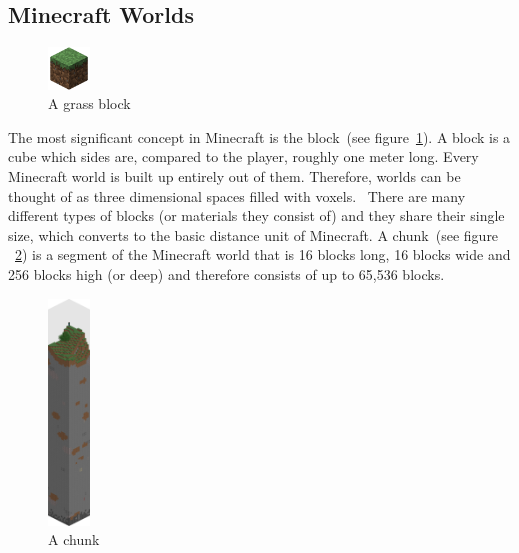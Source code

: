     \subsection{Minecraft Worlds}
    
\begin{figure}
  \begin{center}
    \includegraphics[width=0.1\textwidth]{graphics/block}
  \end{center}
  \caption[A grass block]{A grass block \cite{image_block}}
  \label{mc_block}
\end{figure}

The most significant concept in Minecraft is the block~(see figure~\ref{mc_block}). A block is a cube which sides are, compared to the player, roughly one meter long. Every Minecraft world is built up entirely out of them. Therefore, worlds can be thought of as three dimensional spaces filled with voxels.~\cite{baloghcodemetropolis} There are many different types of blocks (or materials they consist of) and they share their single size, which converts to the basic distance unit of Minecraft. A chunk~(see figure ~\ref{mc_chunk}) is a segment of the Minecraft world that is 16 blocks long, 16 blocks wide and 256 blocks high (or deep) and therefore consists of up to 65,536 blocks.~\cite{mcwiki_chunks}

\begin{figure}
  \begin{center}
    \includegraphics[width=0.10\textwidth]{graphics/chunk}
  \end{center}
  \caption[A chunk]{A chunk \cite{image_chunk}}
  \label{mc_chunk}
\end{figure} 

